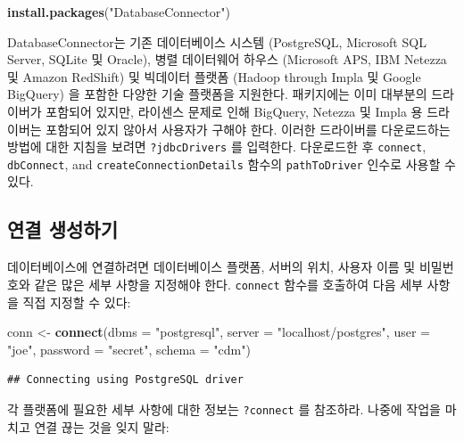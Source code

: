 \documentclass[11pt]{book}
\newenvironment{Shaded}{\begin{snugshade}}{\end{snugshade}}
\newcommand{\KeywordTok}[1]{\textcolor[rgb]{0.13,0.29,0.53}{\textbf{#1}}}
\newcommand{\DataTypeTok}[1]{\textcolor[rgb]{0.13,0.29,0.53}{#1}}
\newcommand{\StringTok}[1]{\textcolor[rgb]{0.31,0.60,0.02}{#1}}
\newcommand{\NormalTok}[1]{#1}
\theoremstyle{definition}
\theoremstyle{definition}
\theoremstyle{definition}
\theoremstyle{remark}
\begin{document}
\begin{Shaded}
\begin{Highlighting}[]
\KeywordTok{install.packages}\NormalTok{(}\StringTok{"DatabaseConnector"}\NormalTok{)}
\end{Highlighting}
\end{Shaded}

DatabaseConnector는 기존 데이터베이스 시스템 (PostgreSQL, Microsoft SQL
Server, SQLite 및 Oracle), 병렬 데이터웨어 하우스 (Microsoft APS, IBM
Netezza 및 Amazon RedShift) 및 빅데이터 플랫폼 (Hadoop through Impla 및
Google BigQuery) 을 포함한 다양한 기술 플랫폼을 지원한다. 패키지에는
이미 대부분의 드라이버가 포함되어 있지만, 라이센스 문제로 인해 BigQuery,
Netezza 및 Impla 용 드라이버는 포함되어 있지 않아서 사용자가 구해야
한다. 이러한 드라이버를 다운로드하는 방법에 대한 지침을 보려면
\texttt{?jdbcDrivers} 를 입력한다. 다운로드한 후 \texttt{connect},
\texttt{dbConnect}, and \texttt{createConnectionDetails} 함수의
\texttt{pathToDriver} 인수로 사용할 수 있다.

\subsection{연결 생성하기}\label{-}

데이터베이스에 연결하려면 데이터베이스 플랫폼, 서버의 위치, 사용자 이름
및 비밀번호와 같은 많은 세부 사항을 지정해야 한다. \texttt{connect}
함수를 호출하여 다음 세부 사항을 직접 지정할 수 있다:

\begin{Shaded}
\begin{Highlighting}[]
\NormalTok{conn <-}\StringTok{ }\KeywordTok{connect}\NormalTok{(}\DataTypeTok{dbms =} \StringTok{"postgresql"}\NormalTok{,}
                \DataTypeTok{server =} \StringTok{"localhost/postgres"}\NormalTok{,}
                \DataTypeTok{user =} \StringTok{"joe"}\NormalTok{,}
                \DataTypeTok{password =} \StringTok{"secret"}\NormalTok{,}
                \DataTypeTok{schema =} \StringTok{"cdm"}\NormalTok{)}
\end{Highlighting}
\end{Shaded}

\begin{verbatim}
## Connecting using PostgreSQL driver
\end{verbatim}

각 플랫폼에 필요한 세부 사항에 대한 정보는 \texttt{?connect} 를
참조하라. 나중에 작업을 마치고 연결 끊는 것을 잊지 말라:
\end{document}
